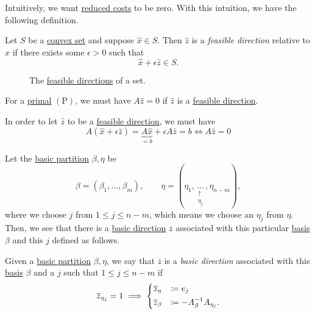 Intuitively, we want \hyperref[def:reduced-cost]{reduced costs} to be zero. With this intuition, we have the following definition.

\begin{definition}\label{def:feasible-direction}
	Let \(S\) be a \hyperref[def:convex-set]{convex set} and suppose \(\hat{x}\in S\). Then \(\hat{z}\) is a \emph{feasible direction} relative to \(\hat{x}\) if there exists some \(\epsilon>0\) such that
	\[
		\hat{x}+\epsilon \hat{z} \in S.
	\]
\end{definition}

\begin{figure}[H]
	\centering
	\caption{The \hyperref[def:feasible-direction]{feasible directions} of a set.}
	\label{fig:feasible-direction}
\end{figure}

\begin{remark}
	For a \hyperref[def:primal]{primal} \((\mathrm{P})\), we must have \(A \hat{z} = 0\) if \(\hat{z}\) is a \hyperref[def:feasible-direction]{feasible direction}.
\end{remark}
\begin{explanation}
	In order to let \(\hat{z}\) to be a \hyperref[def:feasible-direction]{feasible direction}, we must have
	\[
		A(\hat{x} + \epsilon \hat{z}) = \underbrace{A \hat{x}}_{=b} + \epsilon A \hat{z} = b \iff A \hat{z} = 0
	\]
\end{explanation}

Let the \hyperref[def:basic-partition]{basic partition} \(\beta, \eta\) be
\[
	\beta = (\beta_1, \ldots , \beta_m), \qquad \eta = (\eta_1, \underset{\substack{\uparrow \\ \eta_j}}{\ldots} , \eta_{n-m}),
\]
where we choose \(j\) from \(1\leq j \leq n-m\), which means we choose an \(\eta_j\) from \(\eta\). Then, we see that there is a \hyperref[def:basic-direction]{basic direction} \(\overline{z}\) associated with this particular \hyperref[def:basis]{basis} \(\beta \) and this \(j\) defined as follows.

\begin{definition}\label{def:basic-direction}
	Given a \hyperref[def:basic-partition]{basic partition} \(\beta, \eta\), we say that \(\overline{z}\) is a \emph{basic direction} associated with this \hyperref[def:basis]{basis} \(\beta\)
	and a \(j\) such that \(1 \leq j \leq n-m\) if
	\[
		\overline{z}_{\eta_j} = 1 \implies \begin{dcases}
			\overline{z}_{\eta}  & \coloneqq e_j                        \\
			\overline{z}_{\beta} & \coloneqq -A^{-1}_{\beta}A_{\eta_j}.
		\end{dcases}
	\]
\end{definition}

